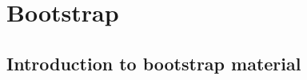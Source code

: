 

\section{Bootstrap}
\providecommand{\bootquantiles}{?}
\providecommand{\bootleft}{?}
\providecommand{\bootright}{?}
\providecommand{\medv}{?}
\providecommand{\powv}{?}
\providecommand{\ymedian}{?}
\providecommand{\bootinference}{?}

\subsection{Introduction to bootstrap material}

